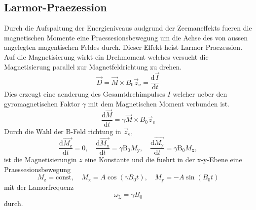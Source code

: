 \subsection{Larmor-Praezession}%
\label{sub:larmor_praezession}
Durch die Aufspaltung der Energieniveaus audgrund der Zeemaneffekts fueren
die magnetischen Momente eine Praessesionsbewegung um die Achse des von aussen
angelegten magentischen Feldes durch. 
Dieser Effekt heist Larmor Praezession. 
Auf die Magnetisierung wirkt ein Drehmoment welches versucht die Magnetisierung
parallel zur Magnetfeldrichtung zu drehen.
\begin{equation}
		\label{eq:dreh}
		\vec{D} = \vec{M} \times B_0 \vec{z}_\text{e} = \frac{\text{d} \vec{I}}{\text{d}t} 
\end{equation}
Dies erzeugt eine aenderung des Gesamtdrehimpulses $I$ welcher ueber den
gyromagnetischen Faktor $\gamma$ mit dem Magnetischen Moment verbunden ist.
\begin{equation}
		\label{eq:dreh}
		\frac{\text{d} \vec{M}}{\text{d}t} = \gamma \vec{M} \times B_0
		\vec{z}_\text{e}
\end{equation}
Durch die Wahl der B-Feld richtung in $\vec{z}_\text{e}$,
\begin{equation}
		\label{eq:ablM}
		\frac{\text{d} \vec{M_\text{z}}}{\text{d}t} = 0 ,  \hspace{1em}
		\frac{\text{d} \vec{M_\text{x}}}{\text{d}t} = \gamma \text{B}_0
		M_\text{y}, \hspace{1em}
		\frac{\text{d} \vec{M_\text{y}}}{\text{d}t} = \gamma \text{B}_0
		M_\text{x}, 
\end{equation}
 ist die Magnetisierungin $z$ eine Konstante und die fuehrt in der x-y-Ebene
 eine Praessesionsbewegung 
\begin{equation}
		\label{eq:schwM}
		M_\text{z} = \text{const}, \hspace{1em} M_\text{x} = A \cos(\gamma B_0
		t ), \hspace{1em} M_\text{y} = -A \sin(B_0 t)
\end{equation}
mit der Lamorfrequenz
\begin{equation}
		\label{eq:larmorf}
		\omega_\text{L} = \gamma B_0
\end{equation}
durch. 

